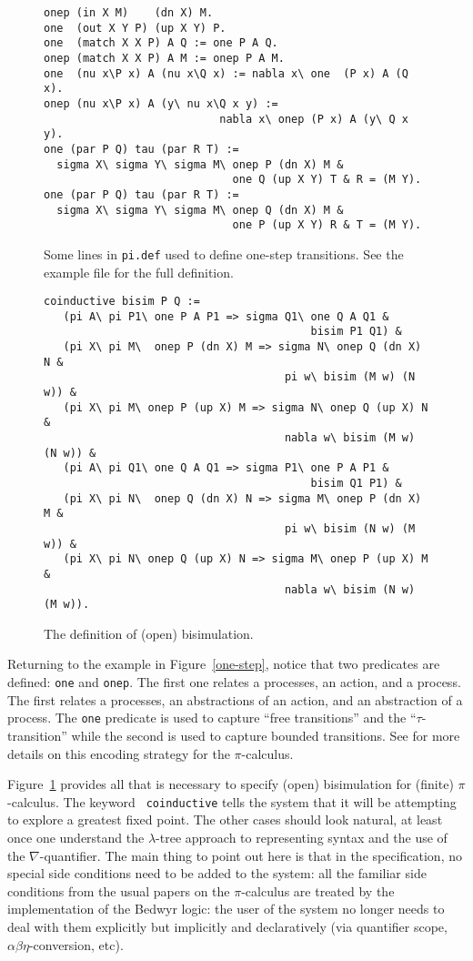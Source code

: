 \documentclass{article}
\begin{document}
\begin{figure}
\begin{verbatim}
onep (in X M)    (dn X) M.
one  (out X Y P) (up X Y) P.
one  (match X X P) A Q := one P A Q.
onep (match X X P) A M := onep P A M.
one  (nu x\P x) A (nu x\Q x) := nabla x\ one  (P x) A (Q x).
onep (nu x\P x) A (y\ nu x\Q x y) := 
                           nabla x\ onep (P x) A (y\ Q x y).
one (par P Q) tau (par R T) :=
  sigma X\ sigma Y\ sigma M\ onep P (dn X) M &
                             one Q (up X Y) T & R = (M Y).
one (par P Q) tau (par R T) :=
  sigma X\ sigma Y\ sigma M\ onep Q (dn X) M &
                             one P (up X Y) R & T = (M Y).
\end{verbatim}
\caption{Some lines in {\tt pi.def} used to define one-step
  transitions.  See the example file for the full definition.}
\label{one-step}

\begin{verbatim}
coinductive bisim P Q :=
   (pi A\ pi P1\ one P A P1 => sigma Q1\ one Q A Q1 &
                                         bisim P1 Q1) &
   (pi X\ pi M\  onep P (dn X) M => sigma N\ onep Q (dn X) N & 
                                     pi w\ bisim (M w) (N w)) &
   (pi X\ pi M\ onep P (up X) M => sigma N\ onep Q (up X) N &
                                     nabla w\ bisim (M w) (N w)) &
   (pi A\ pi Q1\ one Q A Q1 => sigma P1\ one P A P1 & 
                                         bisim Q1 P1) &
   (pi X\ pi N\  onep Q (dn X) N => sigma M\ onep P (dn X) M & 
                                     pi w\ bisim (N w) (M w)) &
   (pi X\ pi N\ onep Q (up X) N => sigma M\ onep P (up X) M &
                                     nabla w\ bisim (N w) (M w)).
\end{verbatim}
\caption{The definition of (open) bisimulation.}
\label{bisim}
\end{figure}

Returning to the example in Figure~\ref{one-step}, notice that two
predicates are defined: {\tt one} and {\tt onep}.  The first one
relates a processes, an action, and a process.  The first relates a 
processes, an abstractions of an action, and an abstraction of a
process.  The {\tt one} predicate is used to capture ``free
transitions'' and the ``$\tau$-transition'' while the second is used
to capture bounded transitions.  See \cite{tiu04fguc,tiu05concur} for
more details on this encoding strategy for the $\pi$-calculus.

Figure~\ref{bisim} provides all that is necessary to specify (open)
bisimulation for (finite) $\pi$-calculus.  The keyword {\tt
coinductive} tells the system that it will be attempting to explore a
greatest fixed point.  The other cases should look natural, at least
once one understand the $\lambda$-tree approach to representing syntax
and the use of the $\nabla$-quantifier.  The main thing to point out
here is that in the specification, no special side conditions need to
be added to the system: all the familiar side conditions from the
usual papers on the $\pi$-calculus are treated by the implementation
of the Bedwyr logic: the user of the system no longer needs to deal
with them explicitly but implicitly and declaratively (via quantifier
scope, $\alpha\beta\eta$-conversion, etc).
\end{document}
